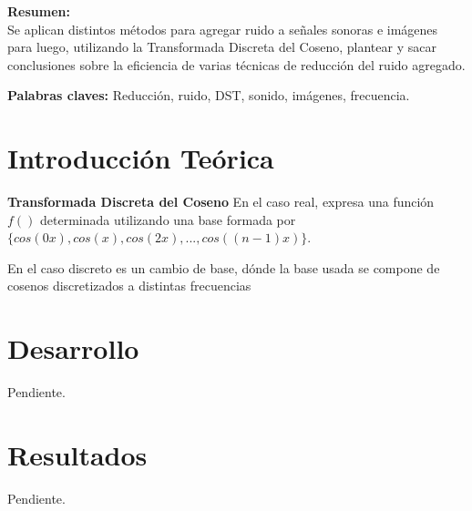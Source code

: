 \documentclass[a4paper,10pt,twoside]{article}
\begin{document}
\textbf{Resumen:} \\
Se aplican distintos métodos para agregar ruido a señales sonoras e imágenes para luego, utilizando la Transformada Discreta del Coseno, plantear y sacar conclusiones sobre la eficiencia de varias técnicas de reducción del ruido agregado.

\textbf{Palabras claves:}
Reducción, ruido, DST, sonido, imágenes, frecuencia.
\newpage



\tableofcontents

\newpage



\section{Introducción Teórica}
\textbf{Transformada Discreta del Coseno}
En el caso real, expresa una función $f()$ determinada utilizando una base formada
por $\{cos(0x),cos(x),cos(2x),...,cos((n-1)x)\}$.

En el caso discreto es un cambio de base, dónde la base usada se compone de cosenos discretizados a distintas frecuencias




\section{Desarrollo}
Pendiente.



\section{Resultados}
Pendiente.
\end{document}
